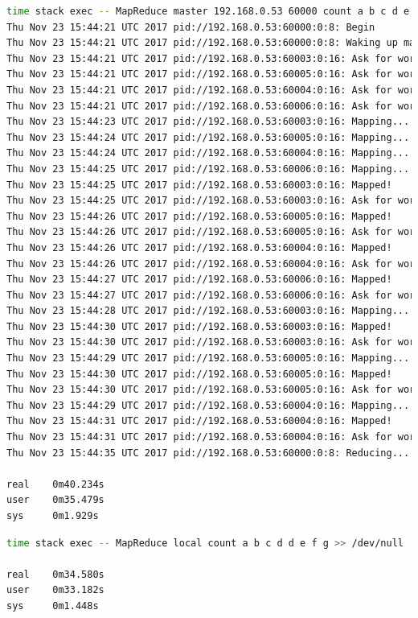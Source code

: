 \documentclass[12pt]{article}
\begin{document}
\begin{lstlisting}[language=bash, basicstyle=\ttfamily\small, caption=4 локальних мапери]
time stack exec -- MapReduce master 192.168.0.53 60000 count a b c d e f g >> /dev/null
Thu Nov 23 15:44:21 UTC 2017 pid://192.168.0.53:60000:0:8: Begin
Thu Nov 23 15:44:21 UTC 2017 pid://192.168.0.53:60000:0:8: Waking up mappers...
Thu Nov 23 15:44:21 UTC 2017 pid://192.168.0.53:60003:0:16: Ask for work
Thu Nov 23 15:44:21 UTC 2017 pid://192.168.0.53:60005:0:16: Ask for work
Thu Nov 23 15:44:21 UTC 2017 pid://192.168.0.53:60004:0:16: Ask for work
Thu Nov 23 15:44:21 UTC 2017 pid://192.168.0.53:60006:0:16: Ask for work
Thu Nov 23 15:44:23 UTC 2017 pid://192.168.0.53:60003:0:16: Mapping...
Thu Nov 23 15:44:24 UTC 2017 pid://192.168.0.53:60005:0:16: Mapping...
Thu Nov 23 15:44:24 UTC 2017 pid://192.168.0.53:60004:0:16: Mapping...
Thu Nov 23 15:44:25 UTC 2017 pid://192.168.0.53:60006:0:16: Mapping...
Thu Nov 23 15:44:25 UTC 2017 pid://192.168.0.53:60003:0:16: Mapped!
Thu Nov 23 15:44:25 UTC 2017 pid://192.168.0.53:60003:0:16: Ask for work
Thu Nov 23 15:44:26 UTC 2017 pid://192.168.0.53:60005:0:16: Mapped!
Thu Nov 23 15:44:26 UTC 2017 pid://192.168.0.53:60005:0:16: Ask for work
Thu Nov 23 15:44:26 UTC 2017 pid://192.168.0.53:60004:0:16: Mapped!
Thu Nov 23 15:44:26 UTC 2017 pid://192.168.0.53:60004:0:16: Ask for work
Thu Nov 23 15:44:27 UTC 2017 pid://192.168.0.53:60006:0:16: Mapped!
Thu Nov 23 15:44:27 UTC 2017 pid://192.168.0.53:60006:0:16: Ask for work
Thu Nov 23 15:44:28 UTC 2017 pid://192.168.0.53:60003:0:16: Mapping...
Thu Nov 23 15:44:30 UTC 2017 pid://192.168.0.53:60003:0:16: Mapped!
Thu Nov 23 15:44:30 UTC 2017 pid://192.168.0.53:60003:0:16: Ask for work
Thu Nov 23 15:44:29 UTC 2017 pid://192.168.0.53:60005:0:16: Mapping...
Thu Nov 23 15:44:30 UTC 2017 pid://192.168.0.53:60005:0:16: Mapped!
Thu Nov 23 15:44:30 UTC 2017 pid://192.168.0.53:60005:0:16: Ask for work
Thu Nov 23 15:44:29 UTC 2017 pid://192.168.0.53:60004:0:16: Mapping...
Thu Nov 23 15:44:31 UTC 2017 pid://192.168.0.53:60004:0:16: Mapped!
Thu Nov 23 15:44:31 UTC 2017 pid://192.168.0.53:60004:0:16: Ask for work
Thu Nov 23 15:44:35 UTC 2017 pid://192.168.0.53:60000:0:8: Reducing...

real    0m40.234s
user    0m35.479s
sys     0m1.929s
\end{lstlisting}

\begin{lstlisting}[language=bash, basicstyle=\ttfamily\small, caption=Послідовний варіант]
time stack exec -- MapReduce local count a b c d d e f g >> /dev/null

real    0m34.580s
user    0m33.182s
sys     0m1.448s
\end{lstlisting}
\end{document}
